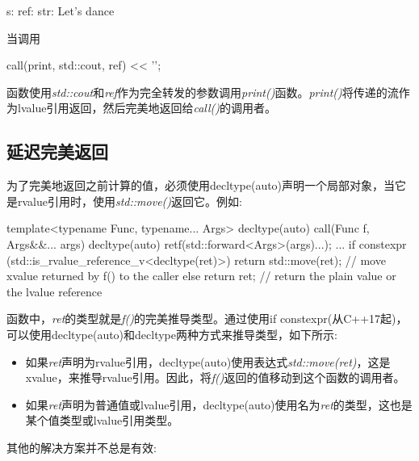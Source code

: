 \begin{outputcode}
s:
ref:
str: Let's dance
\end{outputcode}

当调用

\begin{cppcode}
call(print, std::cout, ref) << '\n';
\end{cppcode}

函数使用\textit{std::cout}和\textit{ref}作为完全转发的参数调用\textit{print()}函数。\textit{print()}将传递的流作为lvalue引用返回，然后完美地返回给\textit{call()}的调用者。

\subsection{延迟完美返回}

为了完美地返回之前计算的值，必须使用decltype(auto)声明一个局部对象，当它是rvalue引用时，使用\textit{std::move()}返回它。例如:

\begin{cppcode}
template<typename Func, typename... Args>
decltype(auto) call(Func f, Args&&... args)
{
	decltype(auto) ret{f(std::forward<Args>(args)...)};
	...
	if constexpr (std::is_rvalue_reference_v<decltype(ret)>) {
		return std::move(ret); // move xvalue returned by f() to the caller
	}
	else {
		return ret; // return the plain value or the lvalue reference
	}
}
\end{cppcode}

函数中，\textit{ret}的类型就是\textit{f()}的完美推导类型。通过使用if constexpr(从C++17起)，可以使用decltype(auto)和decltype两种方式来推导类型，如下所示:

\begin{itemize}
	\item 如果\textit{ret}声明为rvalue引用，decltype(auto)使用表达式\textit{std::move(ret)}，这是xvalue，来推导rvalue引用。因此，将\textit{f()}返回的值移动到这个函数的调用者。
	\item 如果\textit{ret}声明为普通值或lvalue引用，decltype(auto)使用名为\textit{ret}的类型，这也是某个值类型或lvalue引用类型。
\end{itemize}

其他的解决方案并不总是有效:

